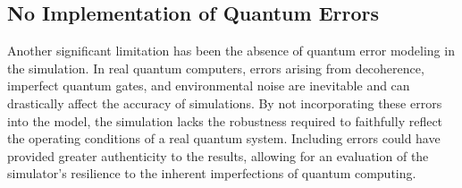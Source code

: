 \subsection{No Implementation of Quantum Errors}
Another significant limitation has been the absence of quantum error modeling in the simulation. In real quantum computers, errors arising from decoherence, imperfect quantum gates, and environmental noise are inevitable and can drastically affect the accuracy of simulations. By not incorporating these errors into the model, the simulation lacks the robustness required to faithfully reflect the operating conditions of a real quantum system. Including errors could have provided greater authenticity to the results, allowing for an evaluation of the simulator's resilience to the inherent imperfections of quantum computing.


